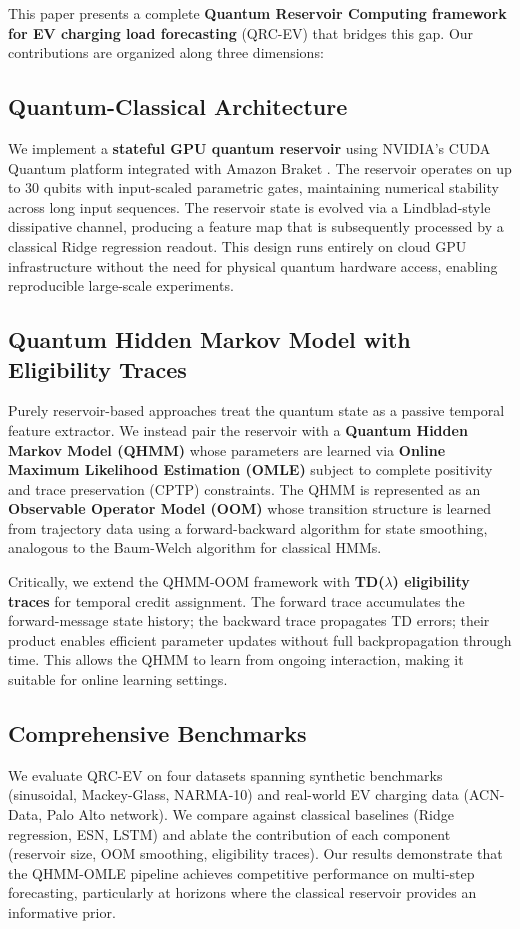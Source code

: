 This paper presents a complete \textbf{Quantum Reservoir Computing
framework for EV charging load forecasting} (QRC-EV) that bridges this
gap. Our contributions are organized along three dimensions:

\subsection{Quantum-Classical Architecture}
We implement a \textbf{stateful GPU quantum reservoir} using NVIDIA's
CUDA Quantum platform \citep{nvidiacudaq} integrated with Amazon Braket
\citep{amazonbraket}. The reservoir operates on up to 30 qubits with
input-scaled parametric gates, maintaining numerical stability across
long input sequences. The reservoir state is evolved via a
Lindblad-style dissipative channel, producing a feature map that is
subsequently processed by a classical Ridge regression readout. This
design runs entirely on cloud GPU infrastructure without the need for
physical quantum hardware access, enabling reproducible large-scale
experiments.

\subsection{Quantum Hidden Markov Model with Eligibility Traces}
Purely reservoir-based approaches treat the quantum state as a passive
temporal feature extractor. We instead pair the reservoir with a
\textbf{Quantum Hidden Markov Model (QHMM)} whose parameters are learned
via \textbf{Online Maximum Likelihood Estimation (OMLE)} subject to
complete positivity and trace preservation (CPTP) constraints. The QHMM
is represented as an \textbf{Observable Operator Model (OOM)} whose
transition structure is learned from trajectory data using a
forward-backward algorithm for state smoothing, analogous to the
Baum-Welch algorithm for classical HMMs.

Critically, we extend the QHMM-OOM framework with
\textbf{TD($\lambda$) eligibility traces} for temporal credit assignment.
The forward trace accumulates the forward-message state history;
the backward trace propagates TD errors; their product enables
efficient parameter updates without full backpropagation through time.
This allows the QHMM to learn from ongoing interaction, making it
suitable for online learning settings.

\subsection{Comprehensive Benchmarks}
We evaluate QRC-EV on four datasets spanning synthetic benchmarks
(sinusoidal, Mackey-Glass, NARMA-10) and real-world EV charging data
(ACN-Data, Palo Alto network). We compare against classical baselines
(Ridge regression, ESN, LSTM) and ablate the contribution of each
component (reservoir size, OOM smoothing, eligibility traces). Our
results demonstrate that the QHMM-OMLE pipeline achieves competitive
performance on multi-step forecasting, particularly at horizons where
the classical reservoir provides an informative prior.

